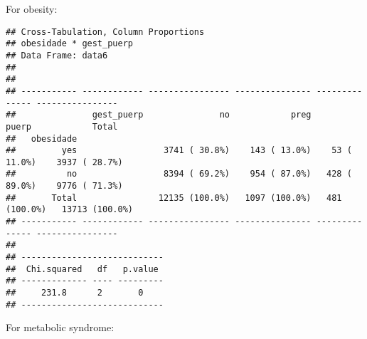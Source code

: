 \documentclass[
]{article}
\newenvironment{Shaded}{\begin{snugshade}}{\end{snugshade}}
\newcommand{\DataTypeTok}[1]{\textcolor[rgb]{0.13,0.29,0.53}{#1}}
\newcommand{\KeywordTok}[1]{\textcolor[rgb]{0.13,0.29,0.53}{\textbf{#1}}}
\newcommand{\NormalTok}[1]{#1}
\newcommand{\OperatorTok}[1]{\textcolor[rgb]{0.81,0.36,0.00}{\textbf{#1}}}
\newcommand{\OtherTok}[1]{\textcolor[rgb]{0.56,0.35,0.01}{#1}}
\newcommand{\StringTok}[1]{\textcolor[rgb]{0.31,0.60,0.02}{#1}}
\begin{document}
For obesity:

\begin{Shaded}
\end{Shaded}

\begin{verbatim}
## Cross-Tabulation, Column Proportions  
## obesidade * gest_puerp  
## Data Frame: data6  
## 
## 
## ----------- ------------ ---------------- --------------- -------------- ----------------
##               gest_puerp               no            preg          puerp            Total
##   obesidade                                                                              
##         yes                 3741 ( 30.8%)    143 ( 13.0%)    53 ( 11.0%)    3937 ( 28.7%)
##          no                 8394 ( 69.2%)    954 ( 87.0%)   428 ( 89.0%)    9776 ( 71.3%)
##       Total                12135 (100.0%)   1097 (100.0%)   481 (100.0%)   13713 (100.0%)
## ----------- ------------ ---------------- --------------- -------------- ----------------
## 
## ----------------------------
##  Chi.squared   df   p.value 
## ------------- ---- ---------
##     231.8      2       0    
## ----------------------------
\end{verbatim}

For metabolic syndrome:

\begin{Shaded}
\end{Shaded}
\end{document}
